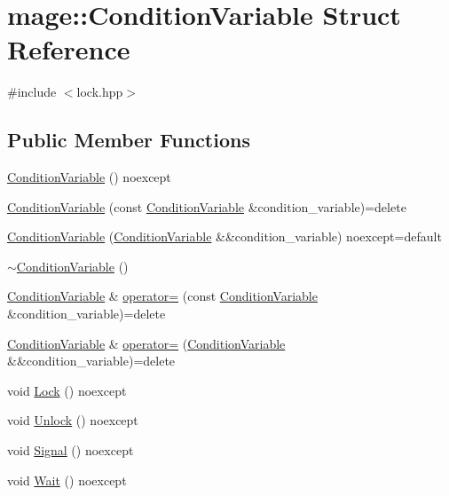 \hypertarget{structmage_1_1_condition_variable}{}\section{mage\+:\+:Condition\+Variable Struct Reference}
\label{structmage_1_1_condition_variable}


{\ttfamily \#include $<$lock.\+hpp$>$}

\subsection*{Public Member Functions}
\begin{DoxyCompactItemize}
\item 
\hyperlink{structmage_1_1_condition_variable_ad4090aa7c9fa24483da84ee87f8196fa}{Condition\+Variable} () noexcept
\item 
\hyperlink{structmage_1_1_condition_variable_add5ccf5807a94588c28621141df334d3}{Condition\+Variable} (const \hyperlink{structmage_1_1_condition_variable}{Condition\+Variable} \&condition\+\_\+variable)=delete
\item 
\hyperlink{structmage_1_1_condition_variable_af9e62cadb0e6bc1c6473ffb1552bd6b2}{Condition\+Variable} (\hyperlink{structmage_1_1_condition_variable}{Condition\+Variable} \&\&condition\+\_\+variable) noexcept=default
\item 
\hyperlink{structmage_1_1_condition_variable_accd5253beb65b2904428afdb889cf00b}{$\sim$\+Condition\+Variable} ()
\item 
\hyperlink{structmage_1_1_condition_variable}{Condition\+Variable} \& \hyperlink{structmage_1_1_condition_variable_ac83eae5353cd004ee06fe2376e5bdbf4}{operator=} (const \hyperlink{structmage_1_1_condition_variable}{Condition\+Variable} \&condition\+\_\+variable)=delete
\item 
\hyperlink{structmage_1_1_condition_variable}{Condition\+Variable} \& \hyperlink{structmage_1_1_condition_variable_a3f05c5b53b2530e9fdd1bb890aa375c4}{operator=} (\hyperlink{structmage_1_1_condition_variable}{Condition\+Variable} \&\&condition\+\_\+variable)=delete
\item 
void \hyperlink{structmage_1_1_condition_variable_aab712c41e76c444606d5419a20d87b7a}{Lock} () noexcept
\item 
void \hyperlink{structmage_1_1_condition_variable_a40e853cf65b0c3cb3788d2b8a45448af}{Unlock} () noexcept
\item 
void \hyperlink{structmage_1_1_condition_variable_ad48673a4f7ea2a28c7ddc77222e5d8cc}{Signal} () noexcept
\item 
void \hyperlink{structmage_1_1_condition_variable_a15a1d797032d178c787a385d11522efb}{Wait} () noexcept
\end{DoxyCompactItemize}
